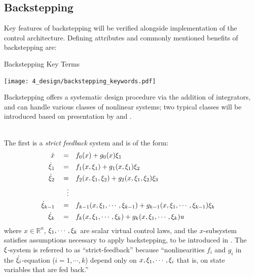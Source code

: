 \documentclass[12pt]{ucthesis}
\begin{document}
\subsection{Backstepping}
\label{sub: backstepping}
Key features of backstepping will be verified alongside implementation of the control architecture. Defining attributes and commonly mentioned benefits of backstepping are:
%
	\begin{table}[H]%
		\centering \label{tab: bstep_keywords}%
		\caption{Backstepping Key Terms}%
		\texttt{[image: 4\_design/backstepping\_keywords.pdf]}%
	\end{table}%

Backstepping offers a systematic design procedure via the addition of integrators, and can handle various classes of nonlinear systems; two typical classes will be introduced based on presentation by \citet[Sec. 2.3.1]{Krstic95} and \citet[Sec. 3.3.2]{Harkegard2003}.

\begin{defn} \label{defn: strict_fb} ~\\
The first is a \textit{strict feedback} system and is of the form:
	\begin{equation} \label{eq: sys_strict_fb}
		\begin{aligned}   %
			\dot{x} 	\quad =& \quad  f_0(x) + g_0(x)\virt_1   					\\
			\dot{\virt}_1 	\quad =& \quad  f_1(x,\virt_1) 			+ g_1(x,\virt_1)\virt_2  											\\
			\dot{\virt}_2 	\quad =& \quad 	f_2(x,\virt_1,\virt_2) 	+ g_2(x,\virt_1,\virt_2)\virt_3 									\\
							\quad \vdots 											\\
			\dot{\virt}_{k-1}\quad =& \quad  f_{k-1}(x,\virt_1,\cdots,\virt_{k-1}) 	+ g_{k-1}(x,\virt_1,\cdots,\virt_{k-1})\virt_k 		\\
			\dot{\virt}_{k} \quad =& \quad  f_{k}(x,\virt_1,\cdots,\virt_{k}) 		+ g_{k}(x,\virt_1,\cdots,\virt_{k})u
		\end{aligned}
	\end{equation}
where $x \in \mathbb{R}^n$, $\xi_1,\cdots,\xi_{k}$ are scalar virtual control laws, and the $x$-subsystem satisfies assumptions necessary to apply backstepping, to be introduced in . The $\xi$-system is referred to as ``strict-feedback'' because ``nonlinearities $f_i$ and $g_i$ in the $\dot{\xi_i}$-equation ($i = 1,\cdots,k$) depend only on $x,\xi_1,\cdots,\xi_{i}$ that is, on state variables that are fed back.'' 
\end{defn}
\end{document}

